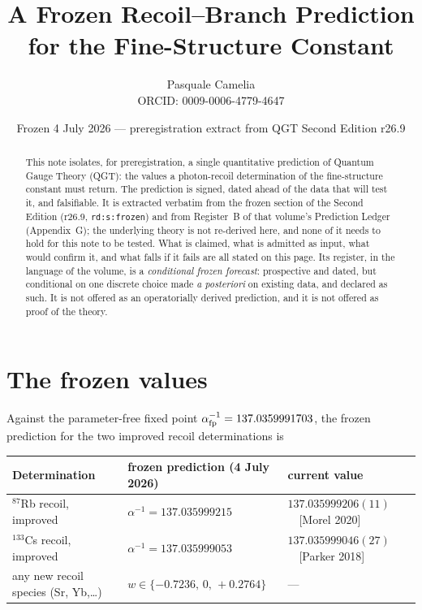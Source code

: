 \documentclass[11pt]{article}
\title{\bfseries A Frozen Recoil--Branch Prediction\\ for the Fine-Structure Constant}
\author{Pasquale Camelia\\
\normalsize ORCID: 0009-0006-4779-4647}
\date{Frozen 4 July 2026 --- preregistration extract from QGT Second Edition r26.9}
\newcommand{\ainv}{\alpha^{-1}}
\begin{document}
\maketitle

\begin{abstract}
\noindent This note isolates, for preregistration, a single quantitative
prediction of Quantum Gauge Theory (QGT): the values a photon-recoil
determination of the fine-structure constant must return. The prediction is
signed, dated ahead of the data that will test it, and falsifiable. It is
extracted verbatim from the frozen section of the Second Edition (r26.9,
\texttt{rd:s:frozen}) and from Register~B of that volume's Prediction Ledger
(Appendix~G); the underlying theory is not re-derived here, and none of it needs
to hold for this note to be tested. What is claimed, what is admitted as input,
what would confirm it, and what falls if it fails are all stated on this page. Its
register, in the language of the volume, is a \emph{conditional frozen forecast}:
prospective and dated, but conditional on one discrete choice made \emph{a
posteriori} on existing data, and declared as such. It is not offered as an
operatorially derived prediction, and it is not offered as proof of the theory.
\end{abstract}

\section{The frozen values}

Against the parameter-free fixed point $\ainv_{\rm fp}=137.0359991703$, the
frozen prediction for the two improved recoil determinations is

\begin{center}
\small
\renewcommand{\arraystretch}{1.3}\setlength{\tabcolsep}{4pt}
\begin{tabular}{lll}
\toprule
Determination & frozen prediction (4 July 2026) & current value\\
\midrule
$^{87}$Rb recoil, improved & $\ainv=137.035999215$ & $137.035999206(11)$\ \ [Morel 2020]\\
$^{133}$Cs recoil, improved & $\ainv=137.035999053$ & $137.035999046(27)$\ \ [Parker 2018]\\
any new recoil species (Sr, Yb,\ldots) & $w\in\{-0.7236,\,0,\,+0.2764\}$ & ---\\
\bottomrule
\end{tabular}
\end{center}
\end{document}
